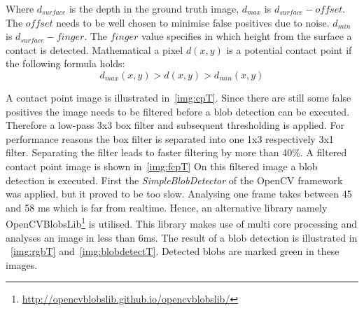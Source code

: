 Where $d_{surface}$ is the depth in the ground truth image, $d_{max}$ is $d_{surface}-\mathit{offset}$. The $\mathit{offset}$ needs to be well chosen to minimise false positives due to noise. $d_{min}$ is $d_{surface}-\mathit{finger}$. The $\mathit{finger}$ value specifies in which height from the surface a contact is detected. Mathematical a pixel $d(x,y)$ is a potential contact point if the following formula holds:
\begin{equation*}
d_{max}(x,y) > d(x,y) > d_{min}(x,y)
\end{equation*}

A contact point image is illustrated in~\autoref{img:cpT}. Since there are still some false positives the image needs to be filtered before a blob detection can be executed. Therefore a low-pass 3x3 box filter and subsequent thresholding is applied. 
For performance reasons the box filter is separated into one 1x3 respectively 3x1 filter. Separating the filter leads to faster filtering by more than 40\%. A filtered contact point image is shown in~\autoref{img:fcpT}
On this filtered image a blob detection is executed. First the \textit{SimpleBlobDetector} of the OpenCV framework was applied, but it proved to be too slow. Analysing one frame takes between 45 and 58 ms which is far from realtime. Hence, an alternative library namely OpenCVBlobsLib\footnote{\url{http://opencvblobslib.github.io/opencvblobslib/}} is utilised. This library makes use of multi core processing and analyses an image in less than 6ms. The result of a blob detection is illustrated in ~\autoref{img:rgbT} and~\autoref{img:blobdetectT}. Detected blobs are marked green in these images.


